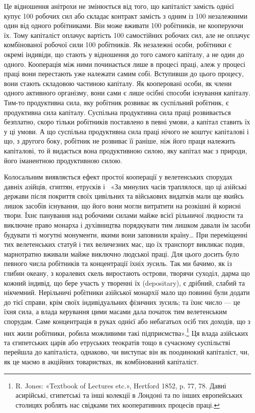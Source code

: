 \parcont{}  %
Це відношення анітрохи не змінюється від того, що капіталіст
замість однієї купує 100 робочих сил або складає контракт замість
з одним із 100 незалежними один від одного робітниками. Він може
вживати 100 робітників, не кооперуючи їх. Тому капіталіст
оплачує вартість 100 самостійних робочих сил, але не оплачує
комбінованої робочої сили 100 робітників. Як незалежні особи,
робітники є окремі індивіди, що стають у відношення до того
самого капіталу, а не один до одного. Кооперація між ними починається
лише в процесі праці, алеж у процесі праці вони перестають
уже належати самим собі. Вступивши до цього процесу,
вони стають складовою частиною капіталу. Як кооперовані
особи, як члени одного активного організму, вони сами є лише
осібні способи існування капіталу. Тим-то продуктивна сила,
яку робітник розвиває як суспільний робітник, є продуктивна
сила капіталу. Суспільна продуктивна сила праці розвивається
безплатно, скоро тільки робітників поставлено в певні умови,
а капітал ставить їх у ці умови. А що суспільна продуктивна
сила праці нічого не коштує капіталові і що, з другого боку, робітник
не розвиває її раніше, ніж його праця належить капіталові,
то й видається вона продуктивною силою, яку капітал має з
природи, його іманентною продуктивною силою.

Колосальним виявляється ефект простої кооперації у велетенських
спорудах давніх азійців, єгиптян, етрусків і~
«За минулих часів траплялося, що ці азійські держави після
покриття своїх цивільних та військових видатків мали ще якийсь
лишок засобів існування, що його вони могли витратити на розкішні
й корисні твори. Їхнє панування над робочими силами майже
всієї рільничої людности та виключне право монарха і духівництва
порядкувати тим лишком давали їм засоби будувати ті
могутні монументи, якими вони заповнили країну\dots{} При переміщенні
тих велетенських статуй і тих величезних мас, що їх
транспорт викликає подив, марнотратно вживали майже виключно
людської праці. Для цього досить було певного числа робітників
та концентрації їхніх зусиль. Так ми бачимо, як із глибин океану,
з коралевих скель виростають острови, творячи суходіл, дарма
що кожний індивід, що бере участь у творенні їх (depositary),
є дрібний, слабий та нікчемний. Нерільничі робітники азійської
монархії мало що повинні були додати до тієї справи, крім
своїх індивідуальних фізичних зусиль; та їхнє число — це їхня
сила, а влада керування цими масами дала початок тим велетенським
спорудам. Саме концентрація в руках однієї або небагатьох
осіб тих доходів, що з них жили робітники, робила можливими
такі підприємства».\footnote{
R. Jones: «Textbook of Lectures etc.», Hertford 1852, p. 77, 78.
Давні асирійські, єгипетські та інші колекції в Лондоні та по інших
европейських столицях роблять нас свідками тих кооперативних процесів
праці.
} Ця влада азійських та єгипетських царів
або етруських теократів тощо в сучасному суспільстві перейшла
до капіталіста, однаково, чи виступає він як поодинокий капіталіст,
чи, як це маємо в акційних товариствах, як комбінований
капіталіст.

